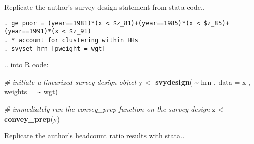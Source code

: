 \documentclass[
]{book}
\newenvironment{Shaded}{\begin{snugshade}}{\end{snugshade}}
\newcommand{\AttributeTok}[1]{\textcolor[rgb]{0.13,0.29,0.53}{#1}}
\newcommand{\CommentTok}[1]{\textcolor[rgb]{0.56,0.35,0.01}{\textit{#1}}}
\newcommand{\DecValTok}[1]{\textcolor[rgb]{0.00,0.00,0.81}{#1}}
\newcommand{\FloatTok}[1]{\textcolor[rgb]{0.00,0.00,0.81}{#1}}
\newcommand{\FunctionTok}[1]{\textcolor[rgb]{0.13,0.29,0.53}{\textbf{#1}}}
\newcommand{\NormalTok}[1]{#1}
\newcommand{\OtherTok}[1]{\textcolor[rgb]{0.56,0.35,0.01}{#1}}
\newcommand{\SpecialCharTok}[1]{\textcolor[rgb]{0.81,0.36,0.00}{\textbf{#1}}}
\begin{document}
\begin{Shaded}
\end{Shaded}

Replicate the author's survey design statement from stata code..

\begin{verbatim}
. ge poor = (year==1981)*(x < $z_81)+(year==1985)*(x < $z_85)+(year==1991)*(x < $z_91)
. * account for clustering within HHs 
. svyset hrn [pweight = wgt]
\end{verbatim}

.. into R code:

\begin{Shaded}
\begin{Highlighting}[]
\CommentTok{\# initiate a linearized survey design object}
\NormalTok{y }\OtherTok{\textless{}{-}} \FunctionTok{svydesign}\NormalTok{( }\SpecialCharTok{\textasciitilde{}}\NormalTok{ hrn , }\AttributeTok{data =}\NormalTok{ x , }\AttributeTok{weights =} \SpecialCharTok{\textasciitilde{}}\NormalTok{ wgt)}

\CommentTok{\# immediately run the \textasciigrave{}convey\_prep\textasciigrave{} function on the survey design}
\NormalTok{z }\OtherTok{\textless{}{-}} \FunctionTok{convey\_prep}\NormalTok{(y)}
\end{Highlighting}
\end{Shaded}

Replicate the author's headcount ratio results with stata..
\end{document}
